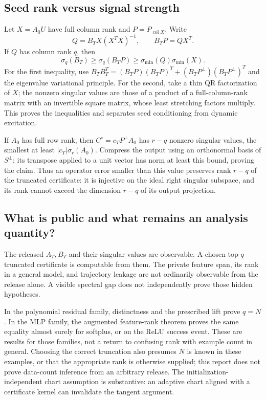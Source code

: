 \documentclass[12pt,a4paper]{article}
\theoremstyle{readable}
\theoremstyle{definition}\newtheorem{example}[theorem]{Example}
\newcommand{\col}{\operatorname{col}}\newcommand{\row}{\operatorname{row}}
\begin{document}
\subsection{Seed rank versus signal strength}
Let \(X=A_0U\) have full column rank and \(P=P_{\col X}\). Write
\[
Q=B_TX(X^TX)^{-1},\qquad B_TP=QX^T.
\]
If \(Q\) has column rank \(q\), then
\[
\sigma_q(B_T)\ge\sigma_q(B_TP)
\ge\sigma_{\min}(Q)\sigma_{\min}(X).
\]
For the first inequality, use
\(B_TB_T^T=(B_TP)(B_TP)^T+(B_TP^\perp)(B_TP^\perp)^T\)
and the eigenvalue variational principle. For the second, take a thin QR factorization of \(X\); the nonzero singular values are those of a product of a full-column-rank matrix with an invertible square matrix, whose least stretching factors multiply. This proves the inequalities and separates seed conditioning from dynamic excitation.

If \(A_0\) has full row rank, then \(C^\circ=c_TP^\perp A_0\) has \(r-q\) nonzero singular values, the smallest at least \(|c_T|\sigma_r(A_0)\). Compress the output using an orthonormal basis of \(S^\perp\); its transpose applied to a unit vector has norm at least this bound, proving the claim. Thus an operator error smaller than this value preserves rank \(r-q\) of the truncated certificate: it is injective on the ideal right singular subspace, and its rank cannot exceed the dimension \(r-q\) of its output projection.

\subsection{What is public and what remains an analysis quantity?}
The released \(A_T,B_T\) and their singular values are observable. A chosen top-\(q\) truncated certificate is computable from them. The private feature span, its rank in a general model, and trajectory leakage are not ordinarily observable from the release alone. A visible spectral gap does not independently prove those hidden hypotheses.

In the polynomial residual family, distinctness and the prescribed lift prove \(q=N\). In the MLP family, the augmented feature-rank theorem proves the same equality almost surely for softplus, or on the ReLU success event. These are results for those families, not a return to confusing rank with example count in general. Choosing the correct truncation also presumes \(N\) is known in these examples, or that the appropriate rank is otherwise supplied; this report does not prove data-count inference from an arbitrary release. The initialization-independent chart assumption is substantive: an adaptive chart aligned with a certificate kernel can invalidate the tangent argument.
\end{document}
